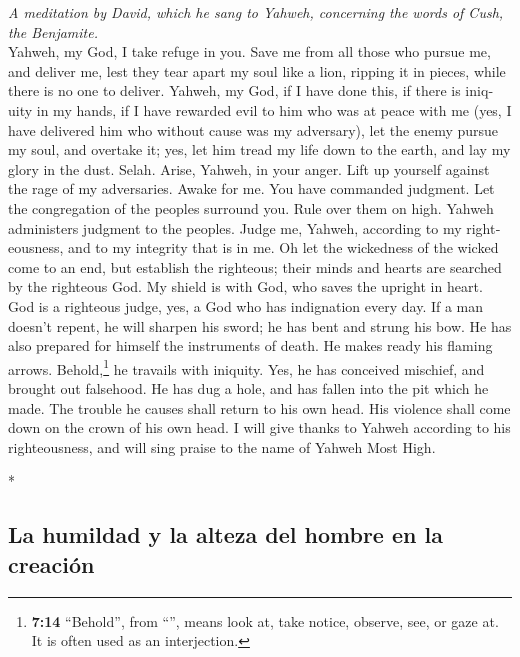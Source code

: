 \begin{paracol}{2}
\begin{otherlanguage}{english}
\emph{A meditation by David, which he sang to Yahweh, concerning the
words of Cush, the Benjamite.}\\
 Yahweh, my God, I take refuge in you. Save me from all
those who pursue me, and deliver me,  lest they tear apart
my soul like a lion, ripping it in pieces, while there is no one to
deliver.  Yahweh, my God, if I have done this, if there is
iniquity in my hands,  if I have rewarded evil to him who
was at peace with me (yes, I have delivered him who without cause was my
adversary),  let the enemy pursue my soul, and overtake
it; yes, let him tread my life down to the earth, and lay my glory in
the dust. Selah.  Arise, Yahweh, in your anger. Lift up
yourself against the rage of my adversaries. Awake for me. You have
commanded judgment.  Let the congregation of the peoples
surround you. Rule over them on high.  Yahweh administers
judgment to the peoples. Judge me, Yahweh, according to my
righteousness, and to my integrity that is in me.  Oh let
the wickedness of the wicked come to an end, but establish the
righteous; their minds and hearts are searched by the righteous God.
 My shield is with God, who saves the upright in heart.
 God is a righteous judge, yes, a God who has indignation
every day.  If a man doesn't repent, he will sharpen his
sword; he has bent and strung his bow.  He has also
prepared for himself the instruments of death. He makes ready his
flaming arrows.  Behold,\footnote{\textbf{7:14}
  ``Behold'', from ``'', means look at, take notice,
  observe, see, or gaze at. It is often used as an interjection.} he
travails with iniquity. Yes, he has conceived mischief, and brought out
falsehood.  He has dug a hole, and has fallen into the
pit which he made.  The trouble he causes shall return to
his own head. His violence shall come down on the crown of his own head.
 I will give thanks to Yahweh according to his
righteousness, and will sing praise to the name of Yahweh Most High.

\end{otherlanguage}

\switchcolumn[0]*

\hypertarget{la-humildad-y-la-alteza-del-hombre-en-la-creaciuxf3n}{%
\subsection{La humildad y la alteza del hombre en la
creación}\label{la-humildad-y-la-alteza-del-hombre-en-la-creaciuxf3n}}


\end{paracol}
